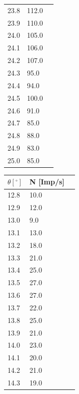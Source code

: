 \begin{minipage}{\linewidth}
\begin{table}[H]
\begin{tabular}{lll}
        23.8	& 112.0 \\
        23.9	& 110.0 \\
        24.0	& 105.0 \\
        24.1	& 106.0 \\
        24.2	& 107.0 \\
        24.3	& 95.0 \\
        24.4	& 94.0 \\
        24.5	& 100.0 \\
        24.6	& 91.0 \\
        24.7	& 85.0 \\
        24.8	& 88.0 \\
        24.9	& 83.0 \\
        25.0	& 85.0 \\
        \bottomrule   
    \end{tabular}
    
    \label{tab:2}
\end{table}
\end{minipage}

\begin{minipage}{\linewidth}
    \begin{table}[H]
        \centering
    \begin{tabular}{lll}
        \toprule
        $\theta [^\circ]$ & N [Imp/s] \\
        \midrule
        12.8 & 	10.0 \\
        12.9 &	12.0 \\
        13.0 &	9.0  \\
        13.1 &	13.0 \\
        13.2 &	18.0 \\
        13.3 &	21.0 \\
        13.4 &	25.0 \\
        13.5 &	27.0 \\
        13.6 &	27.0 \\
        13.7 &	22.0 \\
        13.8 &	25.0 \\
        13.9 &	21.0 \\
        14.0 &	23.0 \\
        14.1 &	20.0 \\
        14.2 &	21.0 \\
        14.3 &	19.0 \\
        \bottomrule   
    \end{tabular}
    
    \label{tab:3}
\end{table}
\end{minipage}

